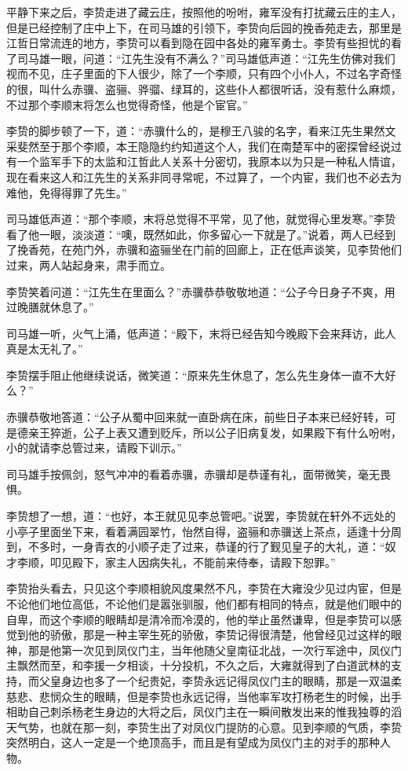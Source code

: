 平静下来之后，李贽走进了藏云庄，按照他的吩咐，雍军没有打扰藏云庄的主人，但是已经控制了庄中上下，在司马雄的引领下，李贽向后园的挽香苑走去，那里是江哲日常流连的地方，李贽可以看到隐在园中各处的雍军勇士。李贽有些担忧的看了司马雄一眼，问道：“江先生没有不满么？”司马雄低声道：“江先生仿佛对我们视而不见，庄子里面的下人很少，除了一个李顺，只有四个小仆人，不过名字奇怪的很，叫什么赤骥、盗骊、骅骝、绿耳的，这些仆人都很听话，没有惹什么麻烦，不过那个李顺末将怎么也觉得奇怪，他是个宦官。”

李贽的脚步顿了一下，道：“赤骥什么的，是穆王八骏的名字，看来江先生果然文采斐然至于那个李顺，本王隐隐约约知道这个人，我们在南楚军中的密探曾经说过有一个监军手下的太监和江哲此人关系十分密切，我原本以为只是一种私人情谊，现在看来这人和江先生的关系非同寻常呢，不过算了，一个内宦，我们也不必去为难他，免得得罪了先生。”

司马雄低声道：“那个李顺，末将总觉得不平常，见了他，就觉得心里发寒。”李贽看了他一眼，淡淡道：“噢，既然如此，你多留心一下就是了。”说着，两人已经到了挽香苑，在苑门外，赤骥和盗骊坐在门前的回廊上，正在低声谈笑，见李贽他们过来，两人站起身来，肃手而立。

李贽笑着问道：“江先生在里面么？”赤骥恭恭敬敬地道：“公子今日身子不爽，用过晚膳就休息了。”

司马雄一听，火气上涌，低声道：“殿下，末将已经告知今晚殿下会来拜访，此人真是太无礼了。”

李贽摆手阻止他继续说话，微笑道：“原来先生休息了，怎么先生身体一直不大好么？”

赤骥恭敬地答道：“公子从蜀中回来就一直卧病在床，前些日子本来已经好转，可是德亲王猝逝，公子上表又遭到贬斥，所以公子旧病复发，如果殿下有什么吩咐，小的就请李总管过来，请殿下训示。”

司马雄手按佩剑，怒气冲冲的看着赤骥，赤骥却是恭谨有礼，面带微笑，毫无畏惧。

李贽想了一想，道：“也好，本王就见见李总管吧。”说罢，李贽就在轩外不远处的小亭子里面坐下来，看着满园翠竹，怡然自得，盗骊和赤骥送上茶点，适逢十分周到，不多时，一身青衣的小顺子走了过来，恭谨的行了觐见皇子的大礼，道：“奴才李顺，叩见殿下，家主人因病失礼，不能前来侍奉，请殿下恕罪。”

李贽抬头看去，只见这个李顺相貌风度果然不凡，李贽在大雍没少见过内宦，但是不论他们地位高低，不论他们是嚣张驯服，他们都有相同的特点，就是他们眼中的自卑，而这个李顺的眼睛却是清冷而冷漠的，他的举止虽然谦卑，但是李贽可以感觉到他的骄傲，那是一种主宰生死的骄傲，李贽记得很清楚，他曾经见过这样的眼神，那是他第一次见到凤仪门主，当年他随父皇南征北战，一次行军途中，凤仪门主飘然而至，和李援一夕相谈，十分投机，不久之后，大雍就得到了白道武林的支持，而父皇身边也多了一个纪贵妃，李贽永远记得凤仪门主的眼睛，那是一双温柔慈悲、悲悯众生的眼睛，但是李贽也永远记得，当他率军攻打杨老生的时候，出手相助自己刺杀杨老生身边的大将之后，凤仪门主在一瞬间散发出来的惟我独尊的滔天气势，也就在那一刻，李贽生出了对凤仪门提防的心意。见到李顺的气质，李贽突然明白，这人一定是一个绝顶高手，而且是有望成为凤仪门主的对手的那种人物。


